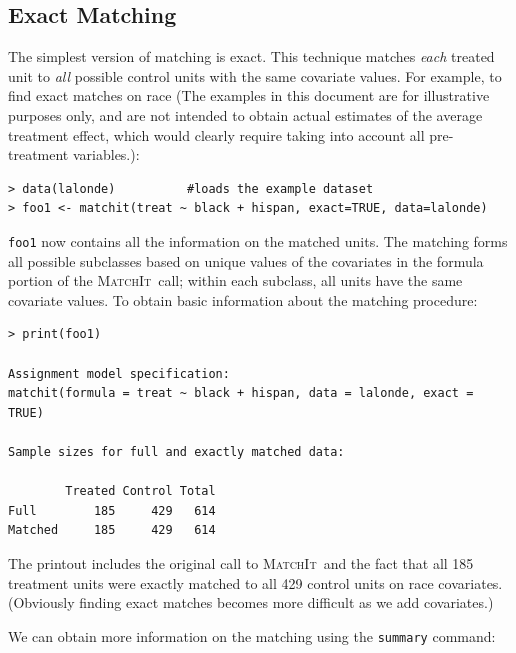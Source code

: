 \documentclass[oneside,letterpaper,titlepage]{article}
\newcommand{\MatchIt}{\textsc{MatchIt}}
\begin{document}
\subsection{Exact Matching \label{exactm}}

The simplest version of matching is exact.  This technique matches
\emph{each} treated unit to \emph{all} possible control units with the
same covariate values.  For example, to find exact matches on race
(The examples in this document are for illustrative purposes only, and
are not intended to obtain actual estimates of the average treatment
effect, which would clearly require taking into account all
pre-treatment variables.):

\begin{verbatim}
> data(lalonde)          #loads the example dataset
> foo1 <- matchit(treat ~ black + hispan, exact=TRUE, data=lalonde)
\end{verbatim}

\noindent \texttt{foo1} now contains all the information on the
matched units.  The matching forms all possible subclasses based on
unique values of the covariates in the formula portion of the
\MatchIt\ call; within each subclass, all units have the same
covariate values.  To obtain basic information about the matching
procedure:

\begin{verbatim}
> print(foo1)
 
Assignment model specification:
matchit(formula = treat ~ black + hispan, data = lalonde, exact = TRUE)
 
Sample sizes for full and exactly matched data:
 
        Treated Control Total
Full        185     429   614
Matched     185     429   614
\end{verbatim} 
The printout includes the original call to \MatchIt\ and the fact that
all 185 treatment units were exactly matched to all 429 control units
on race covariates.  (Obviously finding exact matches becomes more
difficult as we add covariates.)

We can obtain more information on the matching using the {\tt summary}
command:
\end{document}
